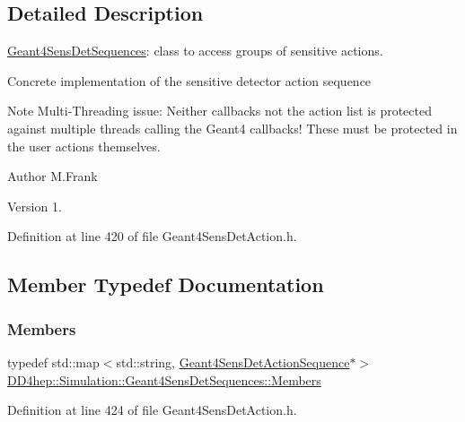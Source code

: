 \subsection{Detailed Description}
\hyperlink{class_d_d4hep_1_1_simulation_1_1_geant4_sens_det_sequences}{Geant4\+Sens\+Det\+Sequences}\+: class to access groups of sensitive actions. 

Concrete implementation of the sensitive detector action sequence

Note Multi-\/\+Threading issue\+: Neither callbacks not the action list is protected against multiple threads calling the Geant4 callbacks! These must be protected in the user actions themselves.

\begin{DoxyAuthor}{Author}
M.\+Frank 
\end{DoxyAuthor}
\begin{DoxyVersion}{Version}
1. 
\end{DoxyVersion}


Definition at line 420 of file Geant4\+Sens\+Det\+Action.\+h.



\subsection{Member Typedef Documentation}
\hypertarget{class_d_d4hep_1_1_simulation_1_1_geant4_sens_det_sequences_a2266138a517dd9b784af9234312fdd12}{}\label{class_d_d4hep_1_1_simulation_1_1_geant4_sens_det_sequences_a2266138a517dd9b784af9234312fdd12} 
\subsubsection{\texorpdfstring{Members}{Members}}
{\footnotesize\ttfamily typedef std\+::map$<$std\+::string, \hyperlink{class_d_d4hep_1_1_simulation_1_1_geant4_sens_det_action_sequence}{Geant4\+Sens\+Det\+Action\+Sequence}$\ast$$>$ \hyperlink{class_d_d4hep_1_1_simulation_1_1_geant4_sens_det_sequences_a2266138a517dd9b784af9234312fdd12}{D\+D4hep\+::\+Simulation\+::\+Geant4\+Sens\+Det\+Sequences\+::\+Members}}



Definition at line 424 of file Geant4\+Sens\+Det\+Action.\+h.



